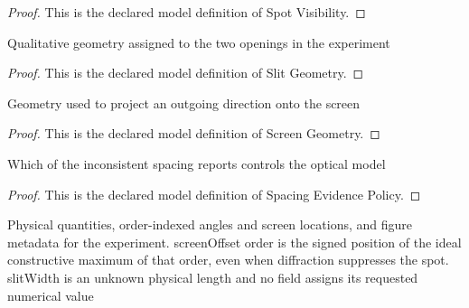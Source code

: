 \begin{proof}
  This is the declared model definition of Spot Visibility.
\end{proof}
\begin{definition}
  \label{def:physics:phyx-mini-0122:phyxminiproblems-problemphyxmini0122-slitgeometry}
  Qualitative geometry assigned to the two openings in the experiment
\end{definition}
\begin{proof}
  This is the declared model definition of Slit Geometry.
\end{proof}
\begin{definition}
  \label{def:physics:phyx-mini-0122:phyxminiproblems-problemphyxmini0122-screengeometry}
  Geometry used to project an outgoing direction onto the screen
\end{definition}
\begin{proof}
  This is the declared model definition of Screen Geometry.
\end{proof}
\begin{definition}
  \label{def:physics:phyx-mini-0122:phyxminiproblems-problemphyxmini0122-spacingevidencepolicy}
  Which of the inconsistent spacing reports controls the optical model
\end{definition}
\begin{proof}
  This is the declared model definition of Spacing Evidence Policy.
\end{proof}
\begin{definition}
  \label{def:physics:phyx-mini-0122:phyxminiproblems-problemphyxmini0122-missingfringedoubleslitsetup}
  Physical quantities, order-indexed angles and screen locations, and figure metadata for the experiment. screenOffset order is the signed position of the ideal constructive maximum of that order, even when diffraction suppresses the spot. slitWidth is an unknown physical length and no field assigns its requested numerical value
\end{definition}
